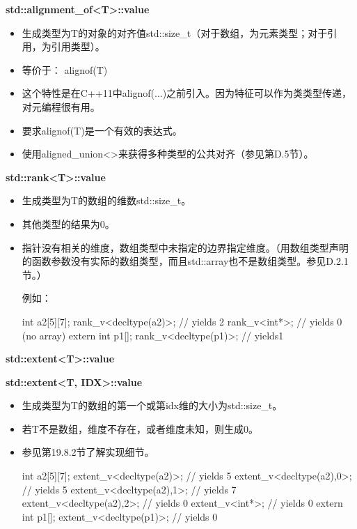 \textbf{std::alignment\_of<T>::value}

\begin{itemize}
\item 
生成类型为T的对象的对齐值std::size\_t（对于数组，为元素类型；对于引用，为引用类型）。

\item 
等价于： alignof(T)

\item 
这个特性是在C++11中alignof(...)之前引入。因为特征可以作为类类型传递，对元编程很有用。

\item 
要求alignof(T)是一个有效的表达式。

\item 
使用aligned\_union<>来获得多种类型的公共对齐（参见第D.5节）。
\end{itemize}

\textbf{std::rank<T>::value}

\begin{itemize}
\item 
生成类型为T的数组的维数std::size\_t。

\item 
其他类型的结果为0。

\item 
指针没有相关的维度，数组类型中未指定的边界指定维度。（用数组类型声明的函数参数没有实际的数组类型，而且std::array也不是数组类型。参见D.2.1节。）

例如：
\begin{cpp}
int a2[5][7];
rank_v<decltype(a2)>; // yields 2
rank_v<int*>; // yields 0 (no array)
extern int p1[];
rank_v<decltype(p1)>; // yields1
\end{cpp}
\end{itemize}

\textbf{std::extent<T>::value}

\textbf{std::extent<T, IDX>::value}

\begin{itemize}
\item 
生成类型为T的数组的第一个或第idx维的大小为std::size\_t。

\item 
若T不是数组，维度不存在，或者维度未知，则生成0。

\item 
参见第19.8.2节了解实现细节。

\begin{cpp}
int a2[5][7];
extent_v<decltype(a2)>; // yields 5
extent_v<decltype(a2),0>; // yields 5
extent_v<decltype(a2),1>; // yields 7
extent_v<decltype(a2),2>; // yields 0
extent_v<int*>; // yields 0
extern int p1[];
extent_v<decltype(p1)>; // yields 0
\end{cpp}
\end{itemize}


